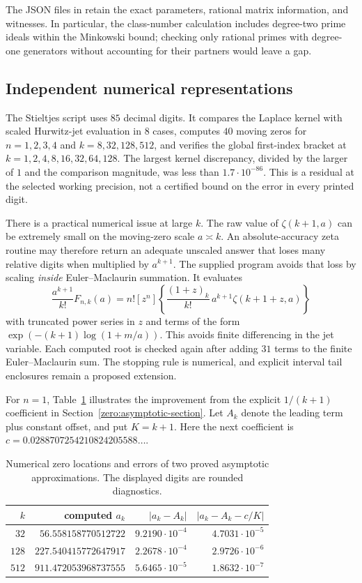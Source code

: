 The JSON files in  retain the exact parameters, rational
matrix information, and witnesses. In particular, the class-number
calculation includes degree-two prime ideals within the Minkowski
bound; checking only rational primes with degree-one generators
without accounting for their partners would leave a gap.

\subsection{Independent numerical representations}

The Stieltjes script uses $85$ decimal digits. It compares the
Laplace kernel with scaled Hurwitz-jet evaluation in $8$ cases,
computes $40$ moving zeros for $n=1,2,3,4$ and
$k=8,32,128,512$, and verifies the global first-index bracket at
$k=1,2,4,8,16,32,64,128$. The largest kernel discrepancy, divided
by the larger of $1$ and the comparison magnitude, was less than
$1.7\cdot10^{-86}$. This is a residual at the selected working
precision, not a certified bound on the error in every printed digit.

There is a practical numerical issue at large $k$. The raw value of
$\zeta(k+1,a)$ can be extremely small on the moving-zero scale
$a\asymp k$. An absolute-accuracy zeta routine may therefore return
an adequate unscaled answer that loses many relative digits when
multiplied by $a^{k+1}$. The supplied program avoids that loss by
scaling \emph{inside} Euler--Maclaurin summation. It evaluates
\[
 \frac{a^{k+1}}{k!}F_{n,k}(a)
 =n![z^n]\left\{
     \frac{(1+z)_k}{k!}\,a^{k+1}\zeta(k+1+z,a)
                  \right\}
\]
with truncated power series in $z$ and terms of the form
$\exp(-(k+1)\log(1+m/a))$. This avoids finite differencing in the
jet variable. Each computed root is checked again after adding
$31$ terms to the finite Euler--Maclaurin sum. The stopping rule is
numerical, and explicit interval tail enclosures remain a proposed
extension.

For $n=1$, Table~\ref{verification:zeros} illustrates the improvement
from the explicit $1/(k+1)$ coefficient in
Section~\ref{zero:asymptotic-section}. Let $A_k$ denote the
leading term plus constant offset, and put $K=k+1$.
Here the next coefficient is
$c=0.0288707254210824205588\ldots$.

\begin{table}[htbp]
\centering
\small
\begin{tabular}{r r r r}
\toprule
$k$ & computed $a_k$ & $|a_k-A_k|$ & $|a_k-A_k-c/K|$\\
\midrule
$32$ & $56.558158770512722$ & $9.2190\cdot10^{-4}$ & $4.7031\cdot10^{-5}$\\
$128$ & $227.540415772647917$ & $2.2678\cdot10^{-4}$ & $2.9726\cdot10^{-6}$\\
$512$ & $911.472053968737555$ & $5.6465\cdot10^{-5}$ & $1.8632\cdot10^{-7}$\\
\bottomrule
\end{tabular}
\caption{Numerical zero locations and errors of two proved asymptotic
approximations. The displayed digits are rounded diagnostics.}
\label{verification:zeros}
\end{table}

